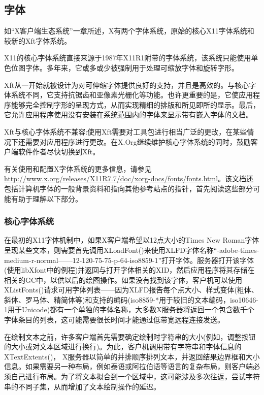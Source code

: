 \subsection{字体}

如“X客户端生态系统”一章所述，X有两个字体系统，原始的核心X11字体系统和较新的Xft字体系统。

X11的核心字体系统直接来源于1987年X11R1附带的字体系统，该系统只能使用单色位图字体。多年来，它或多或少被强制用于处理可缩放字体和旋转字形。

Xft从一开始就被设计为对可伸缩字体提供良好的支持，并且是高效的。与核心字体系统不同，它支持抗锯齿和亚像素光栅化等功能。也许更重要的是，它使应用程序能够完全控制字形的呈现方式，从而实现精细的排版和所见即所的显示。最后，它允许应用程序使用没有安装在系统范围内的字体来显示带有嵌入字体的文档。

Xft与核心字体系统不兼容:使用Xft需要对工具包进行相当广泛的更改，在某些情况下还需要对应用程序进行更改。在X.Org继续维护核心字体系统的同时，鼓励客户端软件作者尽快切换到Xft。

有关使用和配置X字体系统的更多信息，请参见\url{http://www.x.org/releases/X11R7.7/doc/xorg-docs/fonts/fonts.html}。该文档还包括计算机字体的一般背景资料和指向其他参考站点的指针，首先阅读这些部分可能有助于理解以下部分。

\subsubsection{核心字体系统}

在最初的X11字体机制中，如果X客户端希望以12点大小的Times New Roman字体呈现某些文本，则需要首先调用XLoadFont()来使用XLFD字体名称“-adobe-times-medium-r-normal——12-120-75-75-p-64-iso8859-1”打开字体。服务器打开该字体(使用libXfont中的例程)并返回与打开字体相关的XID，然后应用程序将其存储在相关的GC中，以供以后的绘图操作。如果没有找到该字体，客户机可以使用XListFonts()请求可用字体列表——因为XLFD报告每个点大小、样式变体(粗体、斜体、罗马体、精简体等)和支持的编码(iso8859-*用于较旧的文本编码，iso10646-1用于Unicode)都有一个单独的字体名称，大多数X服务器将返回一个包含数千个字体条目的列表，这可能需要很长时间才能通过低带宽远程连接发送。

在绘制文本之前，许多客户端首先需要确定绘制时字符串的大小(例如，调整按钮的大小或对文本区域进行换行)。为此，客户机调用带有字符串和字体信息的XTextExtents()， X服务器以简单的并排顺序排列文本，并返回结果边界框和大小信息。如果需要另一种布局，例如泰语或阿拉伯语等语言的复杂布局，则客户端必须自己进行布局。为了将文本拟合到一个区域中，这可能涉及多次往返，尝试字符串的不同子集，从而增加了文本绘制操作的延迟。


